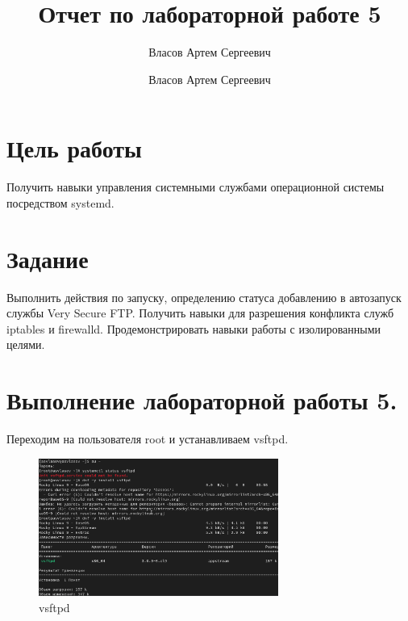 \documentclass[
  12pt,
  a4paper,
  DIV=11,
  numbers=noendperiod]{scrreprt}
\title{Отчет по лабораторной работе 5}
\subtitle{Власов Артем Сергеевич}
\author{Власов Артем Сергеевич}
\date{}
\renewcommand*\contentsname{Содержание}
\newcommand\contentsname{Содержание}
\begin{document}
\maketitle

\renewcommand*\contentsname{Содержание}
{
\setcounter{tocdepth}{1}
\tableofcontents
}
\listoffigures
\listoftables
{}
\chapter{Цель
работы}\label{ux446ux435ux43bux44c-ux440ux430ux431ux43eux442ux44b}

Получить навыки управления системными службами операционной системы
посредством systemd.

\chapter{Задание}\label{ux437ux430ux434ux430ux43dux438ux435}

Выполнить действия по запуску, определению статуса добавлению в
автозапуск службы Very Secure FTP. Получить навыки для разрешения
конфликта служб iptables и firewalld. Продемонстрировать навыки работы с
изолированными целями.

\chapter{Выполнение лабораторной работы
5.}\label{ux432ux44bux43fux43eux43bux43dux435ux43dux438ux435-ux43bux430ux431ux43eux440ux430ux442ux43eux440ux43dux43eux439-ux440ux430ux431ux43eux442ux44b-5.}

Переходим на пользователя root и устанавливаем vsftpd.

\begin{figure}

{\centering \includegraphics[width=0.7\textwidth,height=\textheight]{image/1.png}

}

\caption{vsftpd}

\end{figure}%
\end{document}
